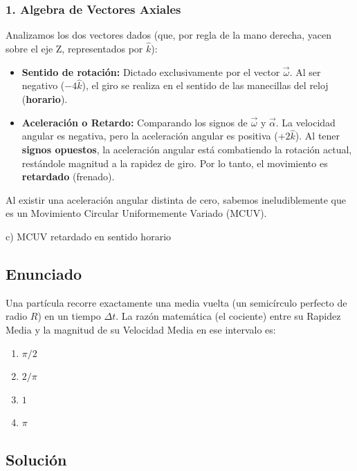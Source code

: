 \documentclass[12pt, a4paper]{article}
\begin{document}
\subsubsection*{1. Algebra de Vectores Axiales}
Analizamos los dos vectores dados (que, por regla de la mano derecha, yacen sobre el eje Z, representados por $\hat{k}$):
\begin{itemize}
    \item \textbf{Sentido de rotación:} Dictado exclusivamente por el vector $\vec{\omega}$. Al ser negativo ($-4\hat{k}$), el giro se realiza en el sentido de las manecillas del reloj (\textbf{horario}).
    \item \textbf{Aceleración o Retardo:} Comparando los signos de $\vec{\omega}$ y $\vec{\alpha}$. La velocidad angular es negativa, pero la aceleración angular es positiva ($+2\hat{k}$). Al tener \textbf{signos opuestos}, la aceleración angular está combatiendo la rotación actual, restándole magnitud a la rapidez de giro. Por lo tanto, el movimiento es \textbf{retardado} (frenado).
\end{itemize}
Al existir una aceleración angular distinta de cero, sabemos ineludiblemente que es un Movimiento Circular Uniformemente Variado (MCUV).

\begin{tcolorbox}[colback=green!5!white, colframe=green!50!black, title=Respuesta Final]
\centering \Large c) MCUV retardado en sentido horario
\end{tcolorbox}

\newpage

\subsection*{Enunciado}
Una partícula recorre exactamente una media vuelta (un semicírculo perfecto de radio $R$) en un tiempo $\Delta t$. La razón matemática (el cociente) entre su Rapidez Media y la magnitud de su Velocidad Media en ese intervalo es:
\begin{enumerate}[label=\alph*)]
    \item $\pi / 2$
    \item $2 / \pi$
    \item $1$
    \item $\pi$
\end{enumerate}

\subsection*{Solución}
\end{document}
